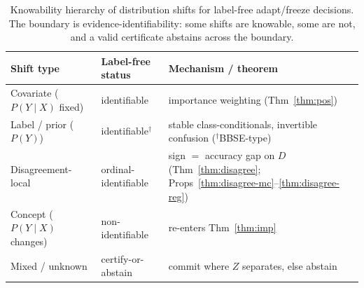 \documentclass[conference]{IEEEtran}
\theoremstyle{plain}
\theoremstyle{definition}
\begin{document}
\begin{table}[t]\centering\small
\begin{tabular}{lll}
\toprule
Shift type & Label-free status & Mechanism / theorem \\
\midrule
Covariate ($P(Y\!\mid\!X)$ fixed) & identifiable & importance weighting (Thm~\ref{thm:pos}) \\
Label / prior ($P(Y)$) & identifiable$^\dagger$ & stable class-conditionals, invertible confusion ($^\dagger$BBSE-type) \\
Disagreement-local & ordinal-identifiable & sign $=$ accuracy gap on $D$ (Thm~\ref{thm:disagree}; Props~\ref{thm:disagree-mc}--\ref{thm:disagree-reg}) \\
Concept ($P(Y\!\mid\!X)$ changes) & non-identifiable & re-enters Thm~\ref{thm:imp} \\
Mixed / unknown & certify-or-abstain & commit where $Z$ separates, else abstain \\
\bottomrule
\end{tabular}
\caption{Knowability hierarchy of distribution shifts for label-free adapt/freeze
decisions. The boundary is evidence-identifiability: some shifts are knowable, some are
not, and a valid certificate abstains across the boundary.}
\label{tab:shift}
\end{table}
\end{document}
